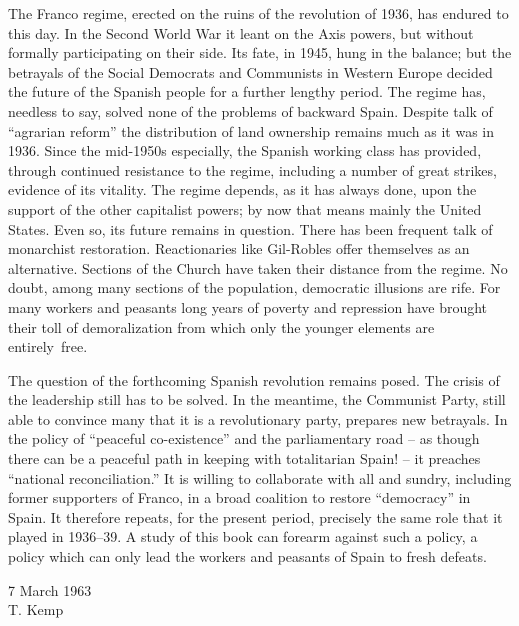 \indexFFranco{}
The Franco regime, erected on the ruins of the revolution of 1936, has endured to this day. In the Second World War it leant on the Axis powers, but without formally participating on their side. Its fate, in 1945, hung in the balance; but the betrayals of the Social Democrats and Communists in Western Europe decided the future of the Spanish people for a further lengthy period. The regime has, needless to say, solved none of the problems of backward Spain. Despite talk of ``agrarian reform'' the distribution of land ownership remains much as it was in 1936. Since the mid-1950s especially, the Spanish working class has provided, through continued resistance to the regime, including a number of great strikes, evidence of its vitality. The regime depends, as it has always done, upon the support of the other capitalist powers; by now that means mainly the United States. Even so, its future remains in question. There has been frequent talk of monarchist restoration. Reactionaries like Gil-Robles{\indexGRobles} offer themselves as an alternative. Sections of the Church have taken their distance from the regime. No doubt, among many sections of the population, democratic illusions are rife. For many workers and peasants long years of poverty and repression have brought their toll of demoralization from which only the younger elements are entirely~free.

\begin{sloppypar}
The question of the forthcoming Spanish revolution remains posed. The crisis of the leadership still has to be solved. In the meantime, the Communist Party, still able to convince many that it is a revolutionary party, prepares new betrayals. In the policy of ``peaceful co-existence'' and the parliamentary road -- as though there can be a peaceful path in keeping with totalitarian Spain! -- it preaches ``national reconciliation.'' It is willing to collaborate with all and sundry, including former supporters of Franco, in a broad coalition to restore ``democracy'' in Spain. It therefore repeats, for the present period, precisely the same role that it played in 1936--39. A study of this book can forearm against such a policy, a policy which can only lead the workers and peasants of Spain to fresh defeats.
\end{sloppypar}

\begin{flushright}
  7 March 1963 \\
  T. Kemp
\end{flushright}